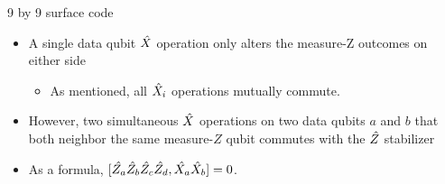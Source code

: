\documentclass{beamer}
\begin{document}
    \begin{frame}{9 by 9 surface code}
        \begin{itemize}
            \item A single data qubit $ \shat{X} $ operation only alters the measure-Z outcomes on either side
            \begin{itemize}
                \item As mentioned, all $ \sshat{X_i} $ operations mutually commute.
            \end{itemize}
            \item However, two simultaneous $ \shat{X} $ operations on two data qubits $ a $ and $ b $ that both neighbor the same measure-$ Z $ qubit commutes with the $ \shat{Z} $ stabilizer
            \item As a formula, $ [\sshat{Z_a}\sshat{Z_b}\sshat{Z_c}\sshat{Z_d}, \sshat{X_a}\sshat{X_b}] = 0$.
        \end{itemize}
    \end{frame}
    
\end{document}
